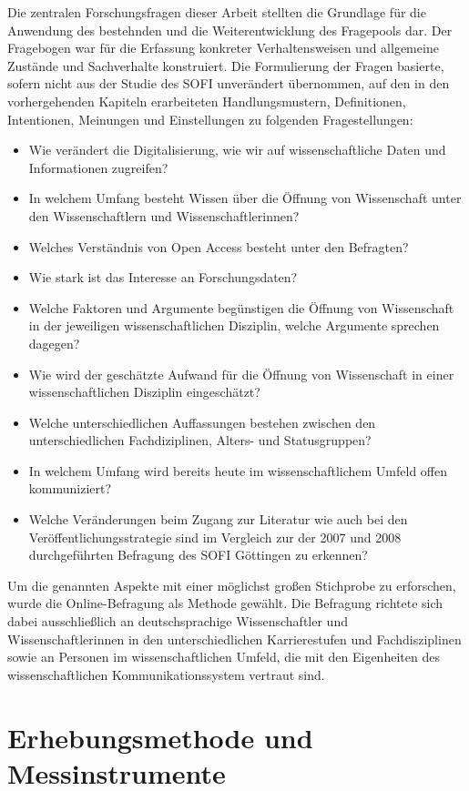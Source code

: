 Die zentralen Forschungsfragen dieser Arbeit stellten die Grundlage für die Anwendung des bestehnden und die Weiterentwicklung des Fragepools dar. Der Fragebogen war für die Erfassung konkreter Verhaltensweisen und allgemeine Zustände und Sachverhalte \cite{raab_2012_fragebogen} konstruiert. Die Formulierung der Fragen basierte, sofern nicht aus der Studie des SOFI unverändert übernommen, auf den in den vorhergehenden Kapiteln erarbeiteten Handlungsmustern, Definitionen, Intentionen, Meinungen und Einstellungen zu folgenden Fragestellungen:
\begin{itemize}
\item Wie verändert die Digitalisierung, wie wir auf wissenschaftliche Daten und Informationen zugreifen?
\item In welchem Umfang besteht Wissen über die Öffnung von Wissenschaft unter den Wissenschaftlern und Wissenschaftlerinnen?
\item Welches Verständnis von Open Access besteht unter den Befragten?
\item Wie stark ist das Interesse an Forschungsdaten?
\item Welche Faktoren und Argumente begünstigen die Öffnung von Wissenschaft in der jeweiligen wissenschaftlichen Disziplin, welche Argumente sprechen dagegen?
\item Wie wird der geschätzte Aufwand für die Öffnung von Wissenschaft in einer wissenschaftlichen Disziplin eingeschätzt?
\item Welche unterschiedlichen Auffassungen bestehen zwischen den unterschiedlichen Fachdiziplinen, Alters- und Statusgruppen?
\item In welchem Umfang wird bereits heute im wissenschaftlichem Umfeld offen kommuniziert?
\item Welche Veränderungen beim Zugang zur Literatur wie auch bei den Veröffentlichungsstrategie sind im Vergleich zur der 2007 und 2008 durchgeführten Befragung des SOFI Göttingen zu erkennen?
\end{itemize}

Um die genannten Aspekte mit einer möglichst großen Stichprobe zu erforschen, wurde die Online-Befragung als Methode gewählt. Die Befragung richtete sich dabei ausschließlich an deutschsprachige Wissenschaftler und Wissenschaftlerinnen in den unterschiedlichen Karrierestufen und Fachdisziplinen sowie an Personen im wissenschaftlichen Umfeld, die mit den Eigenheiten des wissenschaftlichen Kommunikationssystem vertraut sind.

\section{Erhebungsmethode und Messinstrumente}

